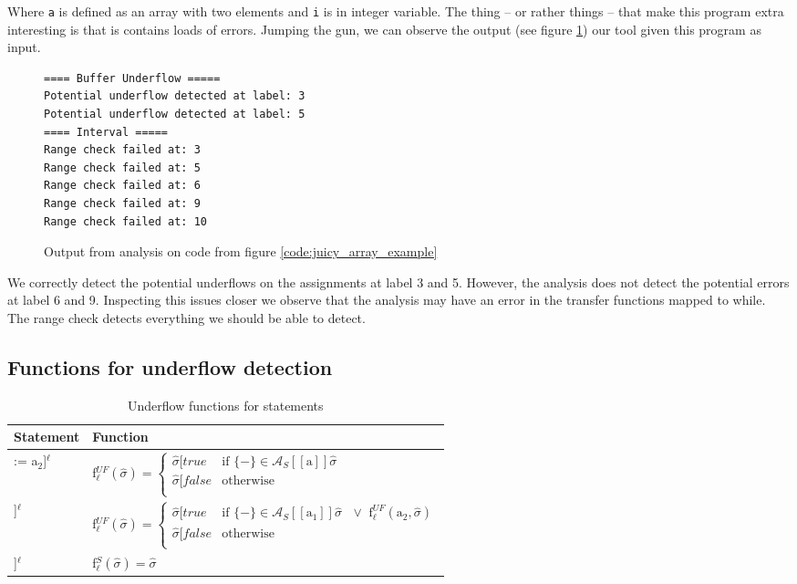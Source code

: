 Where \texttt{a} is defined as an array with two elements and \texttt{i} is in integer variable. The thing -- or rather things -- that make this program extra interesting is that is contains loads of errors. Jumping the gun, we can observe the output (see figure \ref{code:juicy_array_example_output}) our tool given this program as input.
\begin{figure}
  \begin{lstlisting}[numbers=none]
==== Buffer Underflow =====
Potential underflow detected at label: 3
Potential underflow detected at label: 5
==== Interval =====
Range check failed at: 3
Range check failed at: 5
Range check failed at: 6
Range check failed at: 9
Range check failed at: 10
\end{lstlisting}
\caption{Output from analysis on code from figure \ref{code:juicy_array_example}}
\label{code:juicy_array_example_output}
\end{figure}We correctly detect the potential underflows on the assignments at label 3 and 5. However, the analysis does not detect the potential errors at label 6 and 9. Inspecting this issues closer we observe that the analysis may have an error in the transfer functions mapped to while. The range check detects everything we should be able to detect.


\subsection{Functions for underflow detection}
\begin{table}[h]
\begin{tabular}{| l | l |}
  \hline
  Statement & Function \\
  \hline
  \hline
  [A[a$_1$] := a$_2$]$^\ell$ & f$_\ell^{UF} (\widehat{\sigma}) = 
     \begin{cases} 
        \widehat{\sigma}[true   & \text{if } \{-\} \in \mathcal{A}_S [\![\text{a}]\!]\widehat{\sigma}\\
        \widehat{\sigma}[false  & \text{otherwise} \\
     \end{cases}$\\
  \hline
  [read A[a]]$^\ell$ & f$_\ell^{UF} (\widehat{\sigma}) = 
     \begin{cases} 
        \widehat{\sigma}[true   & \text{if } \{-\} \in  \mathcal{A}_S [\![\text{a}_1]\!]\widehat{\sigma}\text{ } \vee \text{ f}_\ell^{UF} (\text{a}_2,\widehat{\sigma}) \\
        \widehat{\sigma}[false  & \text{otherwise} \\
     \end{cases}$\\
  \hline
  [write A[n]]$^\ell$ & f$_\ell^S (\widehat{\sigma}) = \widehat{\sigma}$\\
  \hline
\end{tabular}
\centering
\caption{Underflow functions for statements}
\label{table:underflow_functions_statements}
\end{table}



